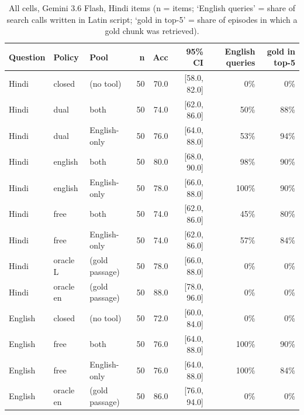 \begin{table}[h]\centering\scriptsize
\begin{tabular}{lllrrrrr}
\toprule
Question & Policy & Pool & n & Acc & 95\% CI & English queries & gold in top-5 \\
\midrule
Hindi & closed & (no tool) & 50 & 70.0 & [58.0, 82.0] & 0\% & 0\% \\
Hindi & dual & both & 50 & 74.0 & [62.0, 86.0] & 50\% & 88\% \\
Hindi & dual & English-only & 50 & 76.0 & [64.0, 88.0] & 53\% & 94\% \\
Hindi & english & both & 50 & 80.0 & [68.0, 90.0] & 98\% & 90\% \\
Hindi & english & English-only & 50 & 78.0 & [66.0, 88.0] & 100\% & 90\% \\
Hindi & free & both & 50 & 74.0 & [62.0, 86.0] & 45\% & 80\% \\
Hindi & free & English-only & 50 & 74.0 & [62.0, 86.0] & 57\% & 84\% \\
Hindi & oracle L & (gold passage) & 50 & 78.0 & [66.0, 88.0] & 0\% & 0\% \\
Hindi & oracle en & (gold passage) & 50 & 88.0 & [78.0, 96.0] & 0\% & 0\% \\
English & closed & (no tool) & 50 & 72.0 & [60.0, 84.0] & 0\% & 0\% \\
English & free & both & 50 & 76.0 & [64.0, 88.0] & 100\% & 90\% \\
English & free & English-only & 50 & 76.0 & [64.0, 88.0] & 100\% & 84\% \\
English & oracle en & (gold passage) & 50 & 86.0 & [76.0, 94.0] & 0\% & 0\% \\
\bottomrule
\end{tabular}
\caption{All cells, Gemini 3.6 Flash, Hindi items (n = items; `English queries' = share of search calls written in Latin script; `gold in top-5' = share of episodes in which a gold chunk was retrieved).}
\end{table}

